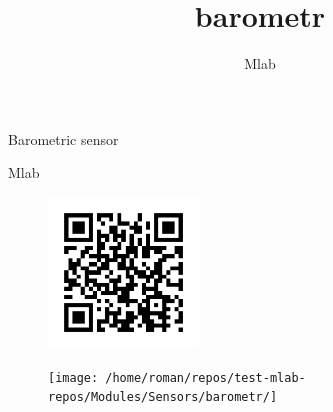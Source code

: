 \documentclass[12pt,a4paper]{article}
\author{ Mlab }
\title{ barometr }
\begin{document}
\fontsize{14.4}{20}\selectfont

\vspace*{\fill}

\begin{center}
{\Huge 
Barometric sensor
}

{\Large Mlab}

\vspace*{\fill}
\vspace*{1cm}

\end{center}

\begin{figure}
    \includegraphics[width=4cm]{DOC/SRC/img/barometr_QRcode.png}
\end{figure}




\vspace*{\fill}
\vfill
\vspace*{1cm}

\begin{figure}[ht!]
\centering
\texttt{[image: /home/roman/repos/test-mlab-repos/Modules/Sensors/barometr/]} 
\end{figure}





\newpage



\end{document}
